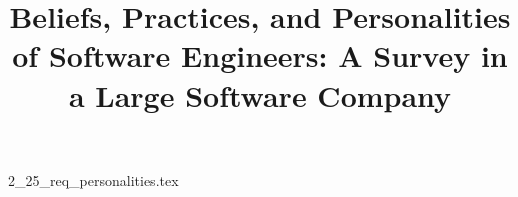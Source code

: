 \documentclass{article}      %
\title{Beliefs, Practices, and Personalities of Software Engineers: A Survey in a Large Software Company}  %
\begin{document}

\maketitle                   %



{2_25_req_personalities.tex}
\printbibliography
\end{document}

